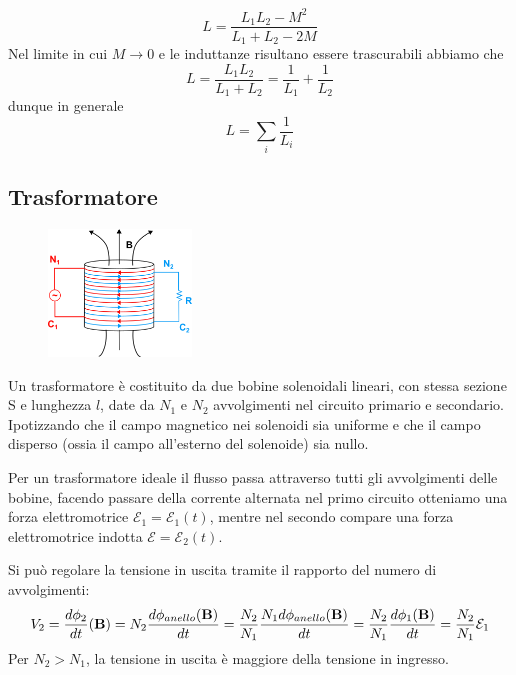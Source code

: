 \begin{equation}
	L = \frac{L_1 L_2 - M^2}{L_1 + L_2 -2M}
\end{equation}
Nel limite in cui $M \to 0$ e le induttanze risultano essere trascurabili abbiamo che 
\begin{equation*}
	L = \frac{L_1L_2}{L_1 + L_2} = \frac{1}{L_1} + \frac{1}{L_2}
\end{equation*}
dunque in generale 
\begin{equation}
	L = \sum_i \frac{1}{L_i}
\end{equation}
\newpage 
\subsection{Trasformatore}

	\begin{figure} %
	\vspace{-0.5cm}
    \centering
    \includegraphics[width=0.34\textwidth]{images/transformator} %
\end{figure}
Un trasformatore \`e costituito da due bobine solenoidali lineari, con stessa sezione S e lunghezza $l$, date da $N_1$ e $N_2$ avvolgimenti nel circuito primario e secondario. 
Ipotizzando che il campo magnetico nei solenoidi sia uniforme e che il campo disperso (ossia il campo all'esterno del solenoide) sia nullo. 
\newline

Per un trasformatore ideale il flusso passa attraverso tutti gli avvolgimenti delle bobine, facendo passare della corrente alternata nel primo circuito otteniamo una forza elettromotrice $\mathcal{E}_1 = \mathcal{E}_1(t)$, mentre nel secondo compare una forza elettromotrice indotta $\mathcal{E} = \mathcal{E}_2(t)$.

Si pu\`o regolare la tensione in uscita tramite il rapporto del numero di avvolgimenti:
\begin{equation*}
	V_2 = \frac{d\phi_2}{dt}(\bold{B}) = N_2 \frac{d \phi_{anello}(\bold{B})}{dt} = \frac{N_2}{N_1} \frac{N_1d \phi_{anello}(\bold{B})}{dt} = \frac{N_2}{N_1} \frac{d \phi_1(\bold{B})}{dt} = \frac{N_2}{N_1} \mathcal{E}_1
\end{equation*}
Per $N_2 > N_1$, la tensione in uscita \`e maggiore della tensione in ingresso. 

